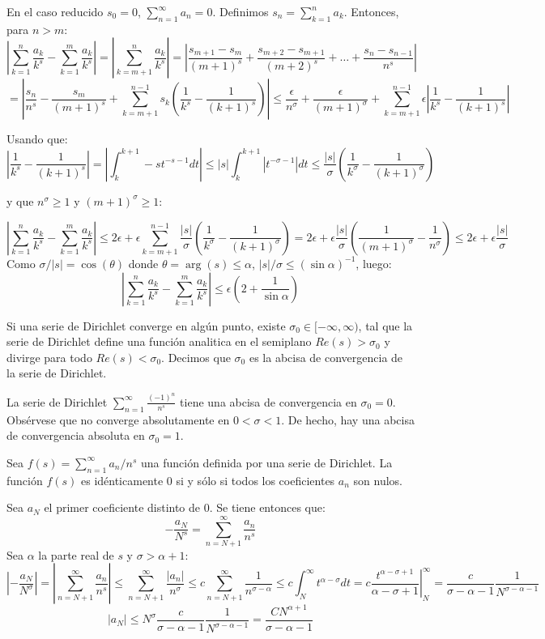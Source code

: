 \documentclass[TAN.tex]{subfiles}
\begin{document}
\begin{dem}
En el caso reducido $s_0=0$, $\sum_{n=1}^\infty a_n = 0$. Definimos $s_n = \sum_{k=1}^n a_k$. Entonces, para $n>m$:
\[ \left|\sum_{k=1}^n\frac{a_k}{k^s}-\sum_{k=1}^m\frac{a_k}{k^s}\right| = \left|\sum_{k=m+1}^n\frac{a_k}{k^s}\right| = \left|\frac{s_{m+1}-s_m}{(m+1)^s} + \frac{s_{m+2}-s_{m+1}}{(m+2)^s}+\dots+\frac{s_{n}-s_{n-1}}{n^s}\right|\]
\[ = \left|\frac{s_n}{n^s}-\frac{s_m}{(m+1)^s}+\sum_{k=m+1}^{n-1}s_k\left(\frac{1}{k^s}-\frac{1}{(k+1)^s}\right)\right| ≤ \frac{ϵ}{n^σ} + \frac{ϵ}{(m+1)^σ} + \sum_{k=m+1}^{n-1} ϵ \left|\frac{1}{k^s}-\frac{1}{(k+1)^s}\right|\]

Usando que:
\[ \left|\frac{1}{k^s}-\frac{1}{(k+1)^s}\right| = \left|\int_k^{k+1}-st^{-s-1}dt\right| ≤ |s|\int_k^{k+1}\left|t^{-σ-1}\right|dt ≤ \frac{|s|}{σ} \left(\frac{1}{k^σ}-\frac{1}{(k+1)^σ}\right)\]

y que $n^σ ≥ 1$ y $(m+1)^σ ≥ 1$:

\[ \left|\sum_{k=1}^n\frac{a_k}{k^s}-\sum_{k=1}^m\frac{a_k}{k^s}\right| ≤ 2ϵ + ϵ \sum_{k=m+1}^{n-1} \frac{|s|}{σ}\left(\frac{1}{k^σ}-\frac{1}{(k+1)^σ}\right) = 2ϵ+ϵ\frac{|s|}{σ}\left(\frac{1}{(m+1)^σ}-\frac{1}{n^σ}\right) ≤ 2ϵ+ϵ\frac{|s|}{σ} \]
Como $σ/|s| = \cos(θ)$ donde $θ = \arg(s) ≤ α$, $|s|/σ ≤ (\sin α)^{-1}$, luego:
\[ \left|\sum_{k=1}^n\frac{a_k}{k^s}-\sum_{k=1}^m\frac{a_k}{k^s}\right| ≤ ϵ\left(2+\frac{1}{\sin α}\right) \]
\end{dem}

\begin{coro}
Si una serie de Dirichlet converge en algún punto, existe $σ_0 \in [-\infty,\infty)$, tal que la serie de Dirichlet define una función analitica en el semiplano $Re(s) > σ_0$ y divirge para todo $Re(s) < σ_0$. Decimos que $σ_0$ es la abcisa de convergencia de la serie de Dirichlet.
\end{coro}

\begin{ej}
La serie de Dirichlet $\sum_{n=1}^\infty \frac{(-1)^n}{n^s}$ tiene una abcisa de convergencia en $σ_0=0$. Obsérvese que no converge absolutamente en $0<σ<1$. De hecho, hay una abcisa de convergencia absoluta en $σ_0=1$.
\end{ej}

\begin{prop} Sea $f(s) = \sum_{n=1}^\infty a_n/n^s$ una función definida por una serie de Dirichlet. La función $f(s)$ es idénticamente $0$ si y sólo si todos los coeficientes $a_n$ son nulos.
\end{prop}
\begin{dem}
Sea $a_N$ el primer coeficiente distinto de 0. Se tiene entonces que:
\[ -\frac{a_N}{N^s} = \sum_{n=N+1}^{∞} \frac{a_n}{n^s} \]
Sea $α$ la parte real de $s$ y $σ > α+1$:
\[ \left|-\frac{a_N}{N^σ}\right| = \left|\sum_{n=N+1}^{∞} \frac{a_n}{n^s}\right| ≤ \sum_{n=N+1}^{∞} \frac{|a_n|}{n^σ} ≤ c \sum_{n=N+1}^{∞} \frac{1}{n^{σ-α}} ≤ c \int_N^{∞} t^{α-σ} dt = c \left.\frac{t^{α-σ+1}}{α-σ+1}\right|_N^{∞} = \frac{c}{σ-α-1} \frac{1}{N^{σ-α-1}}\]
\[ |a_N| ≤ N^σ \frac{c}{σ-α-1} \frac{1}{N^{σ-α-1}} = \frac{CN^{α+1}}{σ-α-1} \]
\end{dem}
\end{document}

